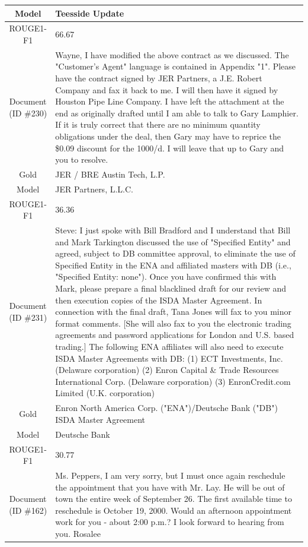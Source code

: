 \begin{table}[bth!]
\begin{tabular}{c|p{}}
\\ \hline
Model & 
Teesside Update
\\ \hline
ROUGE1-F1 & 
66.67
\\ \hline
\makecell{Document\\(ID \#230)} & 
Wayne, I have modified the above contract as we discussed. The "Customer's Agent" language is contained in Appendix "1". Please have the contract signed by JER Partners, a J.E. Robert Company and fax it back to me. I will then have it signed by Houston Pipe Line Company. I have left the attachment at the end as originally drafted until I am able to talk to Gary Lamphier. If it is truly correct that there are no minimum quantity obligations under the deal, then Gary may have to reprice the \$0.09 discount for the 1000/d. I will leave that up to Gary and you to resolve.
\\ \hline
Gold & 
JER / BRE Austin Tech, L.P.
\\ \hline
Model & 
JER Partners, L.L.C.
\\ \hline
ROUGE1-F1 & 
36.36
\\ \hline
\makecell{Document\\(ID \#231)} & 
Steve: I just spoke with Bill Bradford and I understand that Bill and Mark Tarkington discussed the use of "Specified Entity" and agreed, subject to DB committee approval, to eliminate the use of Specified Entity in the ENA and affiliated masters with DB (i.e., "Specified Entity: none"). Once you have confirmed this with Mark, please prepare a final blacklined draft for our review and then execution copies of the ISDA Master Agreement. In connection with the final draft, Tana Jones will fax to you minor format comments. [She will also fax to you the electronic trading agreements and password applications for London and U.S. based trading.] The following ENA affiliates will also need to execute ISDA Master Agreements with DB: (1) ECT Investments, Inc. (Delaware corporation) (2) Enron Capital \& Trade Resources International Corp. (Delaware corporation) (3) EnronCredit.com Limited (U.K. corporation)
\\ \hline
Gold & 
Enron North America Corp. ("ENA")/Deutsche Bank ("DB") ISDA Master Agreement
\\ \hline
Model & 
Deutsche Bank
\\ \hline
ROUGE1-F1 & 
30.77
\\ \hline
\makecell{Document\\(ID \#162)} & 
Ms. Peppers, I am very sorry, but I must once again reschedule the appointment that you have with Mr. Lay. He will be out of town the entire week of September 26. The first available time to reschedule is October 19, 2000. Would an afternoon appointment work for you - about 2:00 p.m.? I look forward to hearing from you. Rosalee

\end{tabular}
\end{table}
